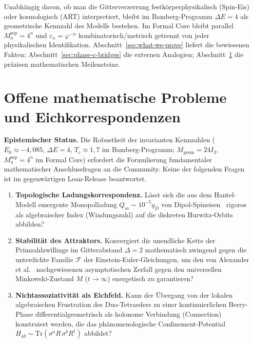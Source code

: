 \documentclass[11pt,a4paper]{article}
\begin{document}
	Unabhängig davon, ob man die Gitterverzerrung festkörperphysikalisch
	(Spin-Eis) oder kosmologisch (ART) interpretiert, bleibt im Bamberg-Programm
	$\Delta E=4$ als geometrische Kennzahl des Modells bestehen.
	Im Formal Core bleibt parallel $M_n^{\mathrm{sep}}=4^n$ und
	$\varepsilon_n=\varphi^{-n}$ kombinatorisch/metrisch getrennt von jeder
	physikalischen Identifikation.
	Abschnitt~\ref{sec:what-we-prove} liefert die bewiesenen Fakten;
	Abschnitt~\ref{sec:phase-c-bridges} die externen Analogien;
	Abschnitt~\ref{sec:open-problems} die präzisen mathematischen Meilensteine.
	
	\section{Offene mathematische Probleme und Eichkorrespondenzen}
	\label{sec:open-problems}
	
	\textbf{Epistemischer Status.}
	Die Robustheit der invarianten Kennzahlen
	($E_0\approx -4{,}085$, $\Delta E=4$, $T_c\approx 1{,}7$ im Bamberg-Programm;
	$M_{\mathrm{geom}}=24I_3$, $M_n^{\mathrm{sep}}=4^n$ im Formal Core)
	erfordert die Formulierung fundamentaler mathematischer Anschlussfragen
	an die Community.
	Keine der folgenden Fragen ist im gegenwärtigen Lean-Release beantwortet.
	
	\begin{enumerate}
		\item \textbf{Topologische Ladungskorrespondenz.}
		Lässt sich die aus dem Hantel-Modell emergente Monopolladung
		$Q_m\sim 10^{-5}q_D$ von Dipol-Spineisen~\cite{zhao-chen-2026}
		rigoros als algebraischer Index (Windungszahl) auf die diskreten
		Hurwitz-Orbits abbilden?
		\item \textbf{Stabilität des Attraktors.}
		Konvergiert die unendliche Kette der Primzahlzwillinge im Gitterabstand
		$\Delta=2$ mathematisch zwingend gegen die unterdichte Familie $\mathcal{F}$
		der Einstein-Euler-Gleichungen, um den von Alexander et al.~\cite{alexander-temple-vogler-2026}
		nachgewiesenen asymptotischen Zerfall gegen den universellen Minkowski-Zustand
		$M$ ($t\to\infty$) energetisch zu garantieren?
		\item \textbf{Nichtassoziativität als Eichfeld.}
		Kann der Übergang von der lokalen algebraischen Frustration des
		Duo-Tetraeders zu einer kontinuierlichen Berry-Phase differentialgeometrisch
		als holonome Verbindung (Connection) konstruiert werden, die das
		phänomenologische Confinement-Potential
		$H_{ab}\sim \mathrm{Tr}(\sigma^a R\,\sigma^b R^\dagger)$
		abbildet?
	\end{enumerate}
	
\end{document}
